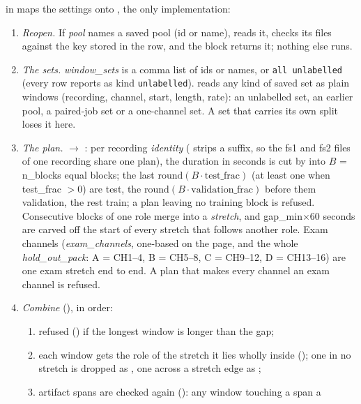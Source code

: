  in  maps the settings onto
, the only implementation:
\begin{enumerate}
\item \emph{Reopen.} If \emph{pool} names a saved pool (id or name),  reads it,
  checks its files against the key stored in the row, and the block returns it; nothing else
  runs.
\item \emph{The sets.} \emph{window\_sets} is a comma list of ids or names, or
  \texttt{all unlabelled} (every row  reports as kind \texttt{unlabelled}).
   reads any kind of saved set as plain windows
  (recording, channel, start, length, rate): an unlabelled set, an earlier pool, a paired-job
  set or a one-channel set. A set that carries its own split loses it here.
\item \emph{The plan.}  $\to$ : per recording
  \emph{identity} ( strips a  suffix, so the fs1 and fs2
  files of one recording share one plan), the duration in seconds is cut by
   into $B$ = n\_blocks equal blocks; the last
  $\mathrm{round}(B\cdot\text{test\_frac})$ (at least one when test\_frac $>0$) are test, the
  $\mathrm{round}(B\cdot\text{validation\_frac})$ before them validation, the rest train; a plan
  leaving no training block is refused. Consecutive blocks of one role merge into a
  \emph{stretch}, and gap\_min$\times 60$ seconds are carved off the start of every stretch
  that follows another role. Exam channels (\emph{exam\_channels}, one-based on the page, and
  the whole \emph{hold\_out\_pack}: A = CH1--4, B = CH5--8, C = CH9--12, D = CH13--16) are one
  exam stretch end to end. A plan that makes every channel an exam channel is refused.
\item \emph{Combine} (), in order:
  \begin{enumerate}
  \item refused () if the longest window is longer than the gap;
  \item each window gets the role of the stretch it lies wholly inside
    (); one in no stretch is dropped as , one across a stretch
    edge as ;
  \item artifact spans are checked again (): any window touching a span a

\end{enumerate}
\end{enumerate}
